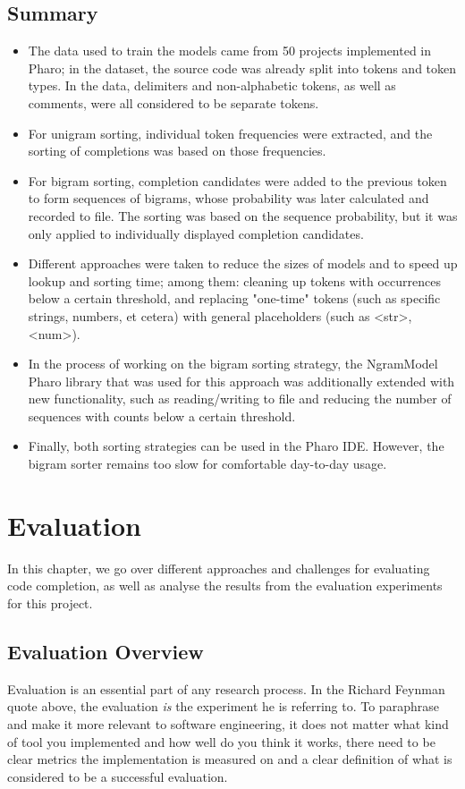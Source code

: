 \documentclass[sigplan,screen]{acmart}
\begin{document}
\subsection{Summary}
\begin{itemize}
    \item The data used to train the models came from 50 projects implemented in Pharo; in the dataset, the source code was already split into tokens and token types. In the data, delimiters and non-alphabetic tokens, as well as comments, were all considered to be separate tokens.
    \item For unigram sorting, individual token frequencies were extracted, and the sorting of completions was based on those frequencies.
    \item For bigram sorting, completion candidates were added to the previous token to form sequences of bigrams, whose probability was later calculated and recorded to file. The sorting was based on the sequence probability, but it was only applied to individually displayed completion candidates.
    \item Different approaches were taken to reduce the sizes of models and to speed up lookup and sorting time; among them: cleaning up tokens with occurrences below a certain threshold, and replacing "one-time" tokens (such as specific strings, numbers, et cetera) with general placeholders (such as <str>, <num>).
    \item In the process of working on the bigram sorting strategy, the NgramModel Pharo library that was used for this approach was additionally extended with new functionality, such as reading/writing to file and reducing the number of sequences with counts below a certain threshold.
    \item Finally, both sorting strategies can be used in the Pharo IDE. However, the bigram sorter remains too slow for comfortable day-to-day usage.
\end{itemize}

\section{Evaluation}
In this chapter, we go over different approaches and challenges for evaluating code completion, as well as analyse the results from the evaluation experiments for this project.

\subsection{Evaluation Overview}
Evaluation is an essential part of any research process. In the Richard Feynman quote above, the evaluation \textit{is} the experiment he is referring to. To paraphrase and make it more relevant to software engineering, it does not matter what kind of tool you implemented and how well do you think it works, there need to be clear metrics the implementation is measured on and a clear definition of what is considered to be a successful evaluation.
\end{document}
